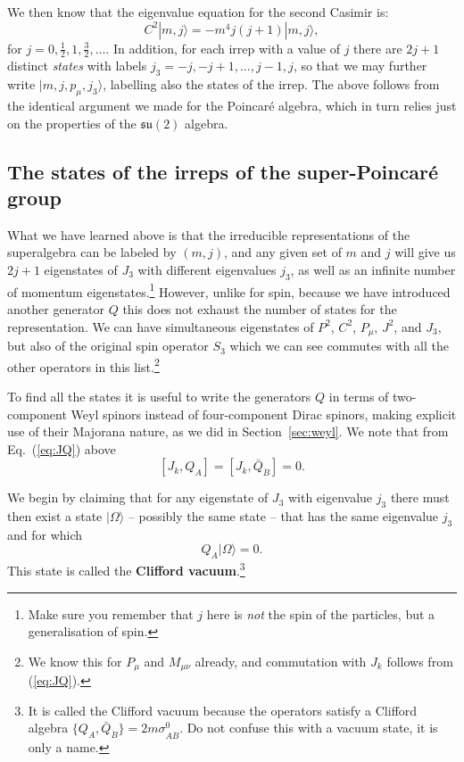 \documentclass[notes.tex]{subfiles}
\begin{document}
We then know that the eigenvalue equation for the second Casimir is:
\[C^2|m, j \rangle = -m^4 j(j+1)|m, j\rangle,\]
for $j=0,\frac{1}{2},1,\frac{3}{2},\ldots$. In addition, for each irrep with a value of $j$ there are $2j+1$ distinct {\it states} with labels $j_3 = -j, -j+1,\ldots,j-1,j$, so that we may  further  write $|m, j, p_\mu, j_3\rangle$,
labelling also the states of the irrep. The above follows from the identical argument we made for the Poincaré algebra, which in turn relies just on the properties of the $\mathfrak{su}(2)$ algebra. 


\subsection{The states of the irreps of the super-Poincaré group}
\label{sec:superalgebrarep}
What we have learned above is that the irreducible representations of the superalgebra can be labeled by $(m, j)$, and any given set of $m$ and $j$ will give us $2j+1$ eigenstates of $J_3$ with different eigenvalues $j_3$, as well as an infinite number of momentum eigenstates.\footnote{Make sure you remember that $j$ here is {\it not} the spin of the particles, but a generalisation of spin.}
However, unlike for spin, because we have introduced another generator $Q$ this does not exhaust the number of states for the representation. We can have simultaneous eigenstates of $P^2$, $C^2$, $P_\mu$, $J^2$, and $J_3$, but also of the original spin operator $S_3$ which we can see commutes with all the other operators in this list.\footnote{We know this for $P_\mu$ and $M_{\mu\nu}$ already, and commutation with $J_k$ follows from (\ref{eq:JQ}).}

To find all the states it is useful to write the generators $Q$ in terms of two-component Weyl spinors instead of four-component Dirac spinors, making explicit use of their Majorana nature, as we did in Section~\ref{sec:weyl}. We note that from Eq.~(\ref{eq:JQ}) above 
\[[J_k, Q_A] = [J_k, \bar{Q}_{\dot{B}}] = 0.\]

We begin by claiming that for any eigenstate of $J_3$ with eigenvalue $j_3$ there must then exist a state $|\Omega\rangle$ -- possibly the same state -- that has the same eigenvalue $j_3$ and for which
\begin{equation}
Q_A|\Omega\rangle = 0.\label{eq:Cliffordvac}
\end{equation}
This state is called the {\bf Clifford vacuum}.\footnote{It is called the Clifford vacuum because the operators satisfy a Clifford algebra $\{Q_A, \bar{Q}_{\dot{B}}\} = 2m\sigma^0_{A\dot{B}}$. Do not confuse this with a vacuum state, it is only a name.} 
\end{document}
